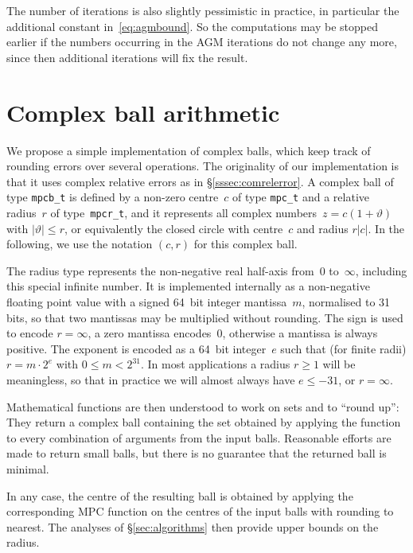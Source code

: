 \documentclass [11pt]{article}
\renewcommand {\theta}{\vartheta}
\renewcommand {\leq}{\leqslant}
\renewcommand {\geq}{\geqslant}
\begin{document}
The number of iterations is also slightly pessimistic in practice,
in particular the additional constant in~\eqref {eq:agmbound}.
So the computations may be stopped earlier if the numbers occurring in
the AGM iterations do not change any more, since then additional
iterations will fix the result.




\section {Complex ball arithmetic}

We propose a simple implementation of complex balls, which keep track of
rounding errors over several operations.
The originality of our implementation is that it uses complex relative
errors as in \S\ref {sssec:comrelerror}. A complex ball of type
\texttt {mpcb\_t} is defined by a non-zero centre~$c$ of type
\texttt {mpc\_t} and a relative radius~$r$ of type~\texttt {mpcr\_t},
and it represents all complex numbers~$z = c (1 + \theta)$ with
$|\theta| \leq r$, or equivalently the closed circle with centre~$c$ and
radius $r |c|$.
In the following, we use the notation $(c, r)$ for this complex ball.

The radius type represents the non-negative real half-axis from~$0$
to~$\infty$, including this special infinite number. It is implemented
internally as a non-negative floating point value with a signed 64~bit
integer mantissa~$m$, normalised to 31 bits, so that two mantissas may be
multiplied without rounding. The sign is used to encode $r = \infty$,
a zero mantissa encodes~$0$, otherwise a mantissa is always positive.
The exponent is encoded as a 64~bit integer~$e$ such that (for finite radii)
$r = m \cdot 2^e$ with $0 \leq m < 2^{31}$.
In most applications a radius $r \geq 1$ will be meaningless, so that
in practice we will almost always have $e \leq -31$, or $r = \infty$.

Mathematical functions are then understood to work on sets and to ``round
up'': They return a complex ball containing the set obtained by applying
the function to every combination of arguments from the input balls.
Reasonable efforts are made to return small balls, but there is no
guarantee that the returned ball is minimal.

In any case, the centre of the resulting ball is obtained by applying
the corresponding MPC function on the centres of the input balls with
rounding to nearest. The analyses of \S\ref {sec:algorithms} then provide
upper bounds on the radius.
\end{document}

